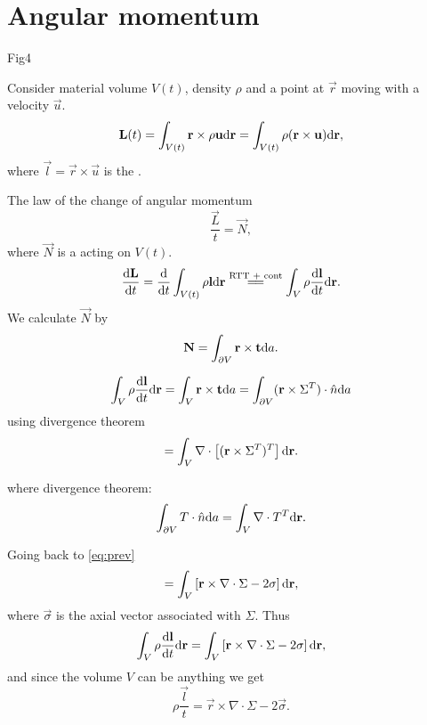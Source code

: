 \documentclass[11pt,oneside]{book}
\theoremstyle{definition} %
\theoremstyle{plain} %
\theoremstyle{remark} %
\theoremstyle{underline}
\begin{document}
  \section{Angular momentum}
  Fig4

  Consider material volume $V(t)$, density $\rho$ and a point at $\vec r$ moving with a velocity $\vec u$.
  \begin{displaymath}
    \mathbf{L} (t) = \int_{V(t)}\mathbf{r} \times \rho \mathbf{u} \mathrm{d} \mathbf{r}
    = \int_{V(t)} \rho (\mathbf{r} \times \mathbf{u}) \mathrm{d} \mathbf{r},
  \end{displaymath}
  where $\vec l = \vec r \times \vec u $ is the .

  The law of the change of angular momentum
  \begin{displaymath}
    \dfrac{ \vec L }{t} = \vec N,
  \end{displaymath}
  where $\vec N$ is a  acting on $V(t)$.
  \begin{displaymath}
    \dfrac{\vec L}{t} = \dfrac{}{t} \int_{V(t)} \rho \vec l \d \vec r \os{\tm{RTT + cont}}{=\joinrel=} \int_V \rho \dfrac{\vec l}{t} \d \vec r.
  \end{displaymath}
  We calculate $\vec N$ by
  \begin{displaymath}
    \mathbf{N} = \int_{\partial V} \mathbf{r} \times\mathbf{t} \mathrm{d} a.
  \end{displaymath}

  \begin{displaymath}
    \int_V \rho \frac{\mathrm{d} \mathbf{l}}{\mathrm{d} t} \mathrm{d} \mathbf{r} = \int_V \mathbf{r} \times \mathbf{t} \mathrm{d} a 
    = \int_{\partial V} (\mathbf{r} \times \Sigma^T) \cdot \hat n \mathrm{d} a 
  \end{displaymath}
  using divergence theorem
  \begin{equation}
    = \int_V \nabla \cdot \left[ ( \mathbf{r} \times \Sigma^T)^T \right] \mathrm{d} \mathbf{r}.
    \label{eq:prev}
  \end{equation}

  where divergence theorem:
  \begin{displaymath}
    \int_{\partial V} T \cdot \hat n \mathrm{d} a = \int_V \nabla \cdot T^T  \mathrm{d} \mathbf{r}.
  \end{displaymath}

  Going back to \ref{eq:prev}
  \begin{displaymath}
     = \int_V \left[ \mathbf{r} \times \nabla \cdot \Sigma - 2 \mathbf{\sigma} \right] \mathrm{d} \mathbf{r},
  \end{displaymath}
  where $\vec \sigma $ is the axial vector associated with $\Sigma$.
  Thus
  \begin{displaymath}
    \int_V \rho \frac{\mathrm{d}  \mathbf{l}}{\mathrm{d} t} \mathrm{d} \mathbf{r} = \int_V \left[ \mathbf{r} \times \nabla \cdot \Sigma - 2 \mathbf{\sigma} \right] \mathrm{d} \mathbf{r} ,
  \end{displaymath}
  and since the volume $V$ can be anything we get
  \begin{equation}
    \rho \dfrac{ \vec l }{t} = \vec r \times \nabla \cdot \Sigma - 2 \vec \sigma.
    \label{eq:2.2}
  \end{equation}
\end{document}
